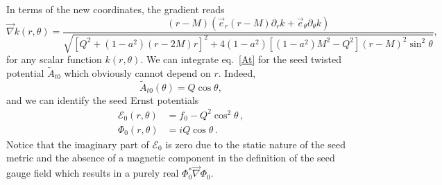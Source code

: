 \documentclass[aps,preprint,groupedaddress,nofootinbib,superscriptaddress,showkeys,showpacs,eqsecnum,amsmath,amssymb]{revtex4-1}
\newcommand{\ernst}{\mathcal{E}}
\begin{document}
In terms of the new coordinates, the gradient reads 
\begin{equation}
    \vec{\nabla}k(r,\theta) = \frac{(r-M)\left(\vec{e}_r (r-M)\partial_r k + \vec{e}_\theta \partial_\theta k \right)}{\sqrt{\left[ Q^2+(1-a^2)(r-2M) r \right]^2 +4(1-a^2)\left[ (1-a^2)M^2 - Q^2\right](r-M)^2\sin^2\theta}},
\end{equation}
for any scalar function $k(r,\theta)$. We can integrate eq.~\eqref{At} for the seed twisted potential $\tilde{A}_{t0}$ which obviously cannot depend on $r$. Indeed, 
\begin{equation}
    \tilde{A}_{t0}(\theta) = Q\cos\theta,
\end{equation}
and we can identify the seed Ernst potentials 
\begin{subequations}
\begin{align}
\ernst_0(r,\theta) &= f_0 - Q^2 \cos^2\theta \,, \\
\Phi_0(r,\theta) &= iQ \cos\theta \,.
\end{align}
\end{subequations}
Notice that the imaginary part of $\ernst_0$ is zero due to the static nature of the seed metric and the absence of a magnetic component in the definition of the seed gauge field which results in a purely real $\Phi_0^\ast \vec{\nabla}\Phi_0$.
\end{document}
